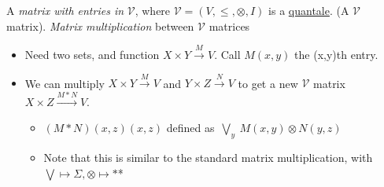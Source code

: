 A \emph{matrix with entries in} $\mathcal{V}$, where $\mathcal{V}=(V, \leq, \otimes, I)$ is a \href{doc/1 math/Seven Sketches in Compositionality/Chapter 2: Resource theories/5 Computing presented V-categories with matrix mult/2 Quantales/1 Quantale}{quantale}. (A $\mathcal{V}$ matrix). \emph{Matrix multiplication} between $\mathcal{V}$ matrices

\begin{itemize}
    \item  Need two sets, and function $X \times Y \xrightarrow{M} V$. Call $M(x,y)$ the (x,y)th entry.
    \item We can multiply $X \times Y \xrightarrow{M} V$ and $Y \times Z \xrightarrow{N} V$ to get a new $\mathcal{V}$ matrix $X \times Z \xrightarrow{M*N} V$.
          \begin{itemize}
            \item $(M*N)(x,z)(x,z)$ defined as \,$\bigvee_y\ M(x,y)\otimes N(y,z)$\,
            \item Note that this is similar to the standard matrix multiplication, with $\bigvee \mapsto \Sigma, \otimes \mapsto *$*
          \end{itemize}
  \end{itemize}
